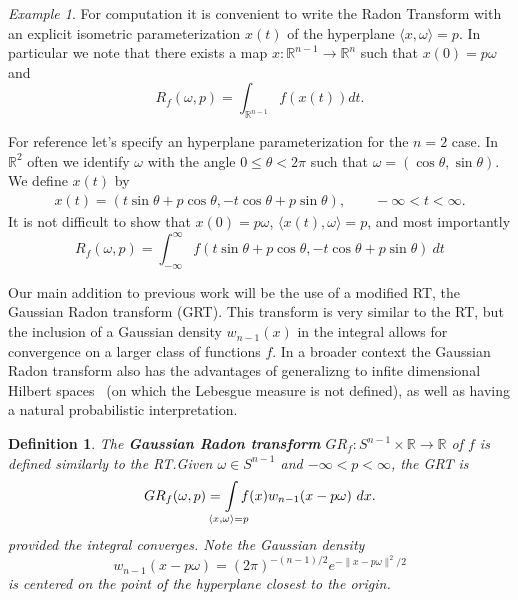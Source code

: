\documentclass{amsart}
\newtheorem{definition}[theorem]{Definition}
\theoremstyle{remark}
\newtheorem{example}[theorem]{Example}
\numberwithin{equation}{section}
\newcommand{\RR}{\mathbb{R}}
\def\mclimits_#1{\limits_{\mathclap{#1}}}
\begin{document}
\begin{example}
For computation it is convenient to write the Radon Transform with an explicit isometric parameterization $x(t)$ of the hyperplane $\langle x, \omega\rangle = p$. In particular we note that there exists a map $x : \RR^{n-1} \longrightarrow \RR^n$ such that $x(0) = p\omega$ and
\[
    R_f(\omega, p) = \int_{\RR^{n-1}} f(x(t)) dt.
\]

For reference let's specify an hyperplane parameterization for the $n=2$ case. In $\RR^2$ often we identify $\omega$ with the angle $0 \leq \theta < 2\pi$ such that $\omega = (\cos \theta, \sin \theta)$. We define $x(t)$ by
\begin{align*}
    x(t) = (t \sin \theta + p \cos \theta, -t \cos \theta + p \sin \theta), \qquad -\infty < t < \infty.
\end{align*}
It is not difficult to show that $x(0) = p\omega$, $\langle x(t), \omega \rangle = p$, and most importantly
\[
    R_f(\omega, p) = \int_{-\infty}^\infty f(t \sin \theta + p \cos \theta, -t \cos \theta + p \sin \theta)~dt
\]
\end{example}

Our main addition to previous work will be the use of a modified RT, the Gaussian Radon transform (GRT). This transform is very similar to the RT, but the inclusion of a Gaussian density $w_{n-1}(x)$ in the integral allows for convergence on a larger class of functions $f$. In a broader context the Gaussian Radon transform also has the advantages of generalizng to infite dimensional Hilbert spaces~\cite{Seng14} (on which the Lebesgue measure is not defined), as well as having a natural probabilistic interpretation.


\begin{definition}
The \textbf{Gaussian Radon transform} $GR_f : S^{n-1} \times \RR \rightarrow \RR$ of $f$ is defined similarly to the RT.\@ Given $\omega \in S^{n-1}$ and $-\infty < p < \infty$, the GRT is
\[
    GR_f(\omega, p) = 
    \int\mclimits_{\langle x, \omega \rangle = p} f(x) w_{n-1}(x - p\omega) ~dx.
\]
provided the integral converges. Note the Gaussian density 
\[
    w_{n-1}(x - p\omega) = {(2\pi)}^{-(n-1)/2}e^{-\|x - p\omega\|^2/2}
\] 
is centered on the point of the hyperplane closest to the origin.
\end{definition}
\end{document}
